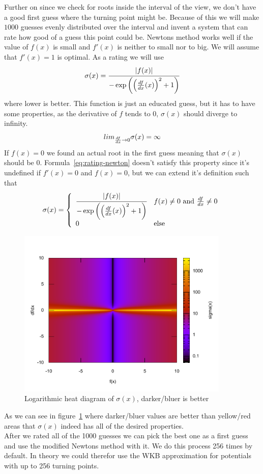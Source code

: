 \documentclass[11pt,DIV=10,final]{scrreprt} %
\newcommand{\deriv}[2]{%
  \frac{d#1}{d#2}
}
\begin{document}
Further on since we check for roots inside the interval of the view, we don't
have a good first guess where the turning point might be. Because of this we will make $1000$
guesses evenly distributed over the interval and invent a system that can rate how good of a
guess this point could be.
Newtons method works well if the value of $f(x)$ is small and $f'(x)$ is neither to small nor to big. We will assume that $f'(x) = 1$ is optimal.
As a rating we will use
\[
  \label{eq:rating-newton}
  \sigma(x) = \cfrac{|f(x)| }{ -\exp\left({{\left(\deriv{f}{x}(x)\right)}^{2} + 1}\right)}
\]
where lower is better. This function is just an educated guess, but it has to have some properties, as the derivative of $f$ tends to 0, $\sigma(x)$ should diverge to infinity.
\[lim_{\deriv{f}{x} \to 0} \sigma(x) = \infty\]
If $f(x) = 0$ we found an actual root in the first guess meaning that $\sigma(x)$ should be 0.
Formula~\ref{eq:rating-newton} doesn't satisfy this property since it's undefined if $f'(x) = 0$ and $f(x) = 0$, but we can extend it's definition such that
\[
  \sigma(x) = \left\{
    \begin{array}{ll}
    \cfrac{|f(x)| }{ -\exp\left({{\left(\deriv{f}{x}(x)\right)}^{2} + 1}\right)} & f(x) \ne 0~\text{and}~\deriv{f}{x} \ne 0 \\
    0 & \text{else}
    \end{array}\right.
\]

\begin{figure}[H]
  \centering
  \includegraphics[width=0.9\textwidth]{plots/newton_rating_func.pdf}
  \caption{Logarithmic heat diagram of $\sigma(x)$, darker/bluer is better}\label{fig:simga-heat}
\end{figure}
As we can see in figure~\ref{fig:simga-heat} where darker/bluer values are better than yellow/red areas that $\sigma(x)$ indeed has all of the desired properties.
\\
After we rated all of the 1000 guesses we can pick the best one as a first guess and use the modified Newtons method with it. We do this process 256 times by default. In theory we could therefor use the WKB approximation for potentials with up to 256 turning points.
\end{document}
